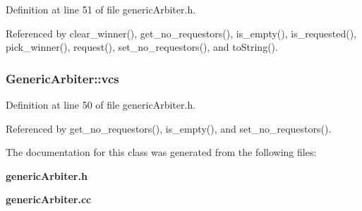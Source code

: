 Definition at line 51 of file genericArbiter.h.

Referenced by clear\_\-winner(), get\_\-no\_\-requestors(), is\_\-empty(), is\_\-requested(), pick\_\-winner(), request(), set\_\-no\_\-requestors(), and toString().
\subsubsection[{vcs}]{ {\bf GenericArbiter::vcs}\hspace{0.3cm}{\tt  [private]}}\label{classGenericArbiter_afc0b7f094d6ee2d8ba620e2bed141f4}




Definition at line 50 of file genericArbiter.h.

Referenced by get\_\-no\_\-requestors(), is\_\-empty(), and set\_\-no\_\-requestors().

The documentation for this class was generated from the following files:\begin{CompactItemize}
\item 
{\bf genericArbiter.h}\item 
{\bf genericArbiter.cc}\end{CompactItemize}
